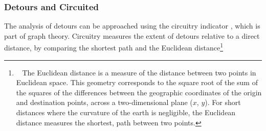\begin{refsegment}
\subsubsection*{Detours and Circuited
    \label{chap5:detours-circuited}
    }

The analysis of detours can be approached using the circuitry indicator \textcolor{blue}{\autocite[1949]{barrington-leigh_global_2020}}, which is part of graph theory. Circuitry measures the extent of detours relative to a direct distance, by comparing the shortest path and the Euclidean distance\footnote{~
The Euclidean distance is a measure of the distance between two points in Euclidean space. This geometry corresponds to the square root of the sum of the squares of the differences between the geographic coordinates of the origin and destination points, across a two-dimensional plane (\(x\), \(y\)). For short distances where the curvature of the earth is negligible, the Euclidean distance measures the shortest,  path between two points.
}
\end{refsegment}
